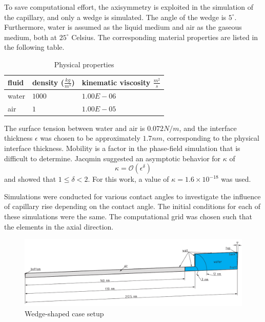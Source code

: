 To save computational effort, the axisymmetry is exploited in the simulation of the capillary, and only a wedge is simulated. The angle of the wedge is \(5^\circ\). Furthermore, water is assumed as the liquid medium and air as the gaseous medium, both at \(25^\circ\) Celsius. The corresponding material properties are listed in the following table.

\begin{table}[h]
\centering
\caption{Physical properties}
\label{tab:physicalProperties_CaseSetup}
\begin{tabular}{lll}
fluid & density ($\frac{kg}{m^3}$) & kinematic viscosity $\frac{m^2}{s}$ \\ \hline
water & $1000$                     & $1.00E-06$                          \\
air   & $1$                        & $1.00E-05$                          \\ 
\end{tabular}
\end{table}

The surface tension between water and air is \(0.072 N/m\), and the interface thickness \( \epsilon \) was chosen to be approximately \(1.7 nm\), corresponding to the physical interface thickness. Mobility is a factor in the phase-field simulation that is difficult to determine. Jacqmin \cite{jacqmin1999CalculationTwoPhaseNavier} suggested an asymptotic behavior for \( \kappa \) of 
\begin{equation}
    \kappa = \mathcal{O}(\epsilon^{\delta})
\end{equation}
and showed that \( 1 \leq \delta < 2 \). 
For this work, a value of \( \kappa = 1.6 \times 10^{-18} \) was used. 

Simulations were conducted for various contact angles to investigate the influence of capillary rise depending on the contact angle. The initial conditions for each of these simulations were the same. The computational grid was chosen such that the elements in the axial direction. 

\begin{figure}[h]
    \centering
    \includegraphics[width=.9\textwidth]{Pictures/Cap_5DEG.pdf}
    \caption{Wedge-shaped case setup}
    \label{fig: wedge_caseSetup}
\end{figure}

